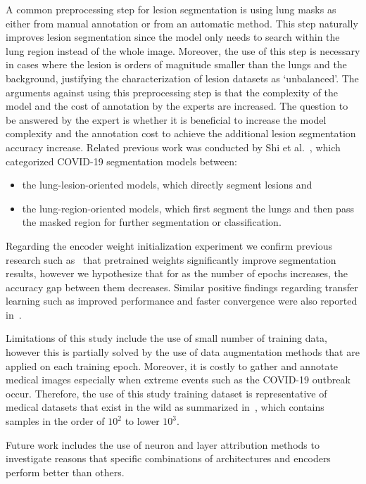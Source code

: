 \documentclass{elsarticle}
\begin{document}
A common preprocessing step for lesion segmentation is using lung masks as either from manual annotation or from an automatic method.
This step naturally improves lesion segmentation since the model only needs to search within the lung region instead of the whole image.
Moreover, the use of this step is necessary in cases where the lesion is orders of magnitude smaller than the lungs and the background, justifying the characterization of lesion datasets as `unbalanced'.
The arguments against using this preprocessing step is that the complexity of the model and the cost of annotation by the experts are increased.
The question to be answered by the expert is whether it is beneficial to increase the model complexity and the annotation cost to achieve the additional lesion segmentation accuracy increase.
Related previous work was conducted by Shi et al.~\cite{shi2020review}, which categorized COVID-19 segmentation models between:
\begin{itemize}
  \item the lung-lesion-oriented models, which directly segment lesions and
  \item the lung-region-oriented models, which first segment the lungs and then pass the masked region for further segmentation or classification.
\end{itemize}

Regarding the encoder weight initialization experiment we confirm previous research such as~\cite{orsic2019defense} that pretrained weights significantly improve segmentation results, however we hypothesize that for as the number of epochs increases, the accuracy gap between them decreases.
Similar positive findings regarding transfer learning such as improved performance and faster convergence were also reported in~\cite{wang2020does}.

Limitations of this study include the use of small number of training data, however this is partially solved by the use of data augmentation methods that are applied on each training epoch.
Moreover, it is costly to gather and annotate medical images especially when extreme events such as the COVID-19 outbreak occur.
Therefore, the use of this study training dataset is representative of medical datasets that exist in the wild as summarized in~\cite{hesamian2019deep}, which contains samples in the order of $10^2$ to lower $10^3$.

Future work includes the use of neuron and layer attribution methods to investigate reasons that specific combinations of architectures and encoders perform better than others.
\end{document}
